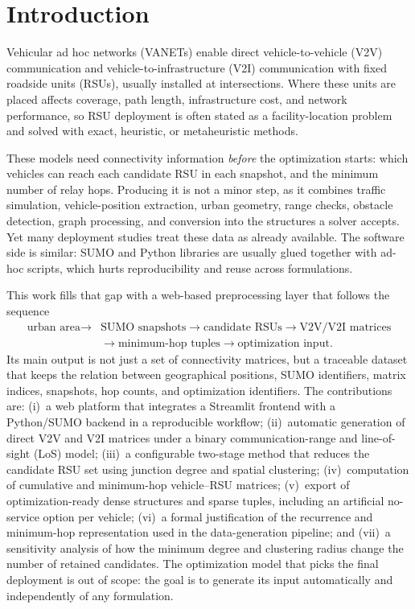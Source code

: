 \documentclass[engproc,proceedingpaper,submit,oneauthor]{Definitions/mdpi}
\begin{document}
\section{Introduction}

Vehicular ad hoc networks (VANETs) enable direct vehicle-to-vehicle (V2V)
communication and vehicle-to-infrastructure (V2I) communication with fixed roadside
units (RSUs), usually installed at intersections. Where these units are placed affects
coverage, path length, infrastructure cost, and network performance, so RSU deployment
is often stated as a facility-location problem and solved with exact, heuristic, or
metaheuristic methods.

These models need connectivity information \emph{before} the optimization starts:
which vehicles can reach each candidate RSU in each snapshot, and the minimum number of
relay hops. Producing it is not a minor step, as it combines traffic simulation,
vehicle-position extraction, urban geometry, range checks, obstacle detection, graph
processing, and conversion into the structures a solver accepts. Yet many deployment
studies treat these data as already available. The software side is similar: SUMO and
Python libraries are usually glued together with ad-hoc scripts, which hurts
reproducibility and reuse across formulations.

This work fills that gap with a web-based preprocessing layer that follows the
sequence
\[
\begin{aligned}
\text{urban area}\rightarrow{}&\text{SUMO snapshots}\rightarrow\text{candidate RSUs}
\rightarrow\text{V2V/V2I matrices}\\
&\rightarrow\text{minimum-hop tuples}\rightarrow\text{optimization input}.
\end{aligned}
\]
Its main output is not just a set of connectivity matrices, but a traceable dataset
that keeps the relation between geographical positions, SUMO identifiers, matrix
indices, snapshots, hop counts, and optimization identifiers. The contributions are:
(i)~a web platform that integrates a Streamlit frontend with a Python/SUMO backend in a
reproducible workflow; (ii)~automatic generation of direct V2V and V2I matrices under a
binary communication-range and line-of-sight (LoS) model; (iii)~a configurable
two-stage method that reduces the candidate RSU set using junction degree and spatial
clustering; (iv)~computation of cumulative and minimum-hop vehicle--RSU matrices;
(v)~export of optimization-ready dense structures and sparse tuples, including an
artificial no-service option per vehicle; (vi)~a formal justification of the recurrence
and minimum-hop representation used in the data-generation pipeline; and (vii)~a
sensitivity analysis of how the minimum degree and clustering radius change the number
of retained candidates. The optimization model that picks the final deployment is out
of scope: the goal is to generate its input automatically and independently of any
formulation.
\end{document}
